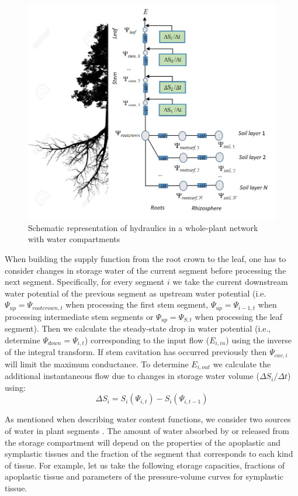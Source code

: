 \documentclass[]{book}
\begin{document}
\begin{figure}

{\centering \includegraphics[width=0.8\linewidth]{hydraulics_full} 

}

\caption{Schematic representation of hydraulics in a whole-plant network with water compartments}\label{fig:unnamed-chunk-45}
\end{figure}

When building the supply function from the root crown to the leaf, one has to consider changes in storage water of the current segment before processing the next segment. Specifically, for every segment \(i\) we take the current downstream water potential of the previous segment as upstream water potential (i.e. \(\Psi_{up} = \Psi_{rootcrown, t}\) when processing the first stem segment, \(\Psi_{up} = \Psi_{i-1, t}\) when processing intermediate stem segments or \(\Psi_{up} = \Psi_{S, t}\) when processing the leaf segment). Then we calculate the steady-state drop in water potential (i.e., determine \(\Psi_{down} = \Psi_{i, t}\)) corresponding to the input flow (\(E_{i,in}\)) using the inverse of the integral transform. If stem cavitation has occurred previously then \(\Psi_{cav,i}\) will limit the maximum conductance. To determine \(E_{i,out}\) we calculate the additional instantaneous flow due to changes in storage water volume (\(\Delta S_{i}/\Delta t\)) using:
\begin{equation}
\Delta S_{i} = S_i(\Psi_{i, t}) - S_i(\Psi_{i, t-1})
\end{equation}

As mentioned when describing water content functions, we consider two sources of water in plant segments \citep{Tyree1990}. The amount of water absorbed by or released from the storage compartment will depend on the properties of the apoplastic and symplastic tissues and the fraction of the segment that corresponds to each kind of tissue. For example, let us take the following storage capacities, fractions of apoplastic tissue and parameters of the pressure-volume curves for symplastic tissue.
\end{document}
